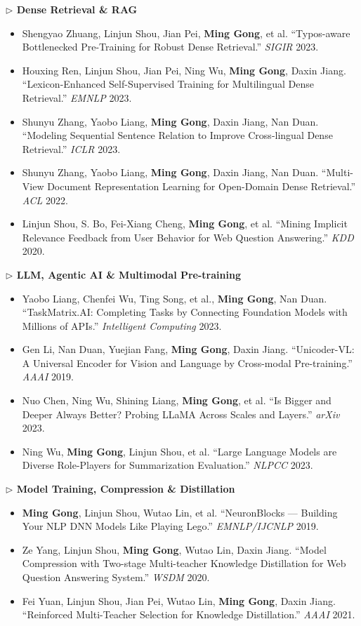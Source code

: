 \documentclass[10.5pt,letterpaper]{article}
\begin{document}
\noindent\textcolor{blue!60!black}{\textbf{$\triangleright$ Dense Retrieval \& RAG}}
\begin{itemize}
  \item Shengyao Zhuang, Linjun Shou, Jian Pei, \textbf{Ming Gong}, et al. ``Typos-aware Bottlenecked Pre-Training for Robust Dense Retrieval.'' \textit{SIGIR} 2023.
  \item Houxing Ren, Linjun Shou, Jian Pei, Ning Wu, \textbf{Ming Gong}, Daxin Jiang. ``Lexicon-Enhanced Self-Supervised Training for Multilingual Dense Retrieval.'' \textit{EMNLP} 2023.
  \item Shunyu Zhang, Yaobo Liang, \textbf{Ming Gong}, Daxin Jiang, Nan Duan. ``Modeling Sequential Sentence Relation to Improve Cross-lingual Dense Retrieval.'' \textit{ICLR} 2023.
  \item Shunyu Zhang, Yaobo Liang, \textbf{Ming Gong}, Daxin Jiang, Nan Duan. ``Multi-View Document Representation Learning for Open-Domain Dense Retrieval.'' \textit{ACL} 2022.
  \item Linjun Shou, S. Bo, Fei-Xiang Cheng, \textbf{Ming Gong}, et al. ``Mining Implicit Relevance Feedback from User Behavior for Web Question Answering.'' \textit{KDD} 2020.
\end{itemize}

\noindent\textcolor{blue!60!black}{\textbf{$\triangleright$ LLM, Agentic AI \& Multimodal Pre-training}}
\begin{itemize}
  \item Yaobo Liang, Chenfei Wu, Ting Song, et al., \textbf{Ming Gong}, Nan Duan. ``TaskMatrix.AI: Completing Tasks by Connecting Foundation Models with Millions of APIs.'' \textit{Intelligent Computing} 2023.
  \item Gen Li, Nan Duan, Yuejian Fang, \textbf{Ming Gong}, Daxin Jiang. ``Unicoder-VL: A Universal Encoder for Vision and Language by Cross-modal Pre-training.'' \textit{AAAI} 2019.
  \item Nuo Chen, Ning Wu, Shining Liang, \textbf{Ming Gong}, et al. ``Is Bigger and Deeper Always Better? Probing LLaMA Across Scales and Layers.'' \textit{arXiv} 2023.
  \item Ning Wu, \textbf{Ming Gong}, Linjun Shou, et al. ``Large Language Models are Diverse Role-Players for Summarization Evaluation.'' \textit{NLPCC} 2023.
\end{itemize}

\noindent\textcolor{blue!60!black}{\textbf{$\triangleright$ Model Training, Compression \& Distillation}}
\begin{itemize}
  \item \textbf{Ming Gong}, Linjun Shou, Wutao Lin, et al. ``NeuronBlocks --- Building Your NLP DNN Models Like Playing Lego.'' \textit{EMNLP/IJCNLP} 2019.
  \item Ze Yang, Linjun Shou, \textbf{Ming Gong}, Wutao Lin, Daxin Jiang. ``Model Compression with Two-stage Multi-teacher Knowledge Distillation for Web Question Answering System.'' \textit{WSDM} 2020.
  \item Fei Yuan, Linjun Shou, Jian Pei, Wutao Lin, \textbf{Ming Gong}, Daxin Jiang. ``Reinforced Multi-Teacher Selection for Knowledge Distillation.'' \textit{AAAI} 2021.
\end{itemize}
\end{document}
